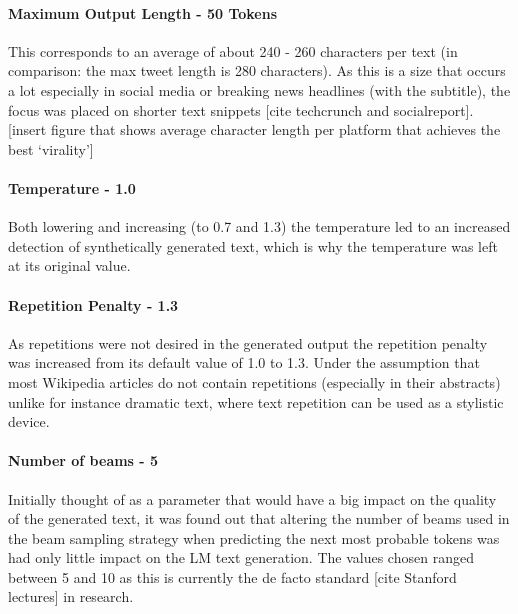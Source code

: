 \paragraph*{Maximum Output Length - 50 Tokens}
This corresponds to an average of about 240 - 260 characters per text (in comparison: the max tweet length is 280 characters). As this is a 
size that occurs a lot especially in social media or breaking news headlines (with the subtitle), the focus was placed on shorter text 
snippets [cite techcrunch and socialreport]. 
[insert figure that shows average character length per platform that achieves the best ‘virality’]

\paragraph*{Temperature - 1.0}
Both lowering and increasing (to 0.7 and 1.3) the temperature led to an increased detection of synthetically generated text, which is why 
the temperature was left at its original value.

\paragraph*{Repetition Penalty - 1.3}
As repetitions were not desired in the generated output the repetition penalty was increased from its default value of 1.0 to 1.3. Under the 
assumption that most Wikipedia articles do not contain repetitions (especially in their abstracts) unlike for instance dramatic text, where text 
repetition can be used as a stylistic device.

\paragraph*{Number of beams - 5}
Initially thought of as a parameter that would have a big impact on the quality of the generated text, it was found out that altering the number 
of beams used in the beam sampling strategy when predicting the next most probable tokens was had only little impact on the LM text generation. 
The values chosen ranged between 5 and 10 as this is currently the de facto standard [cite Stanford lectures] in research.
